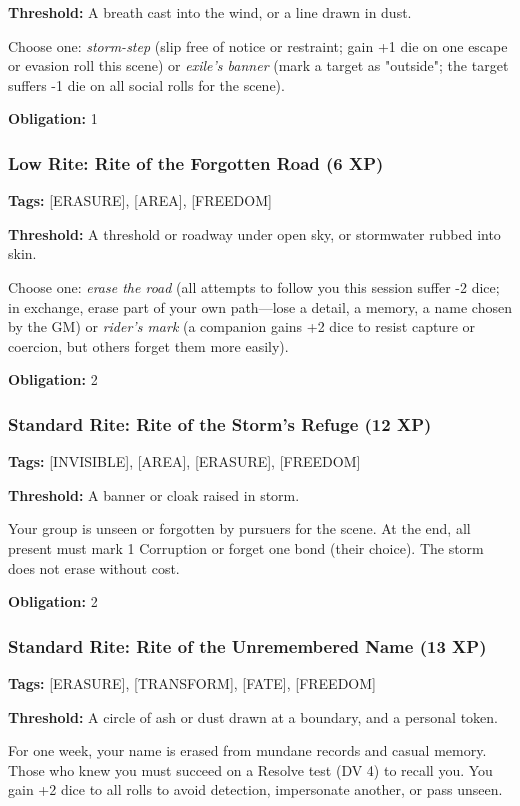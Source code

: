 \textbf{Threshold:} A breath cast into the wind, or a line drawn in dust.

Choose one: \textit{storm-step} (slip free of notice or restraint; gain +1 die on one escape or evasion roll this scene) or \textit{exile's banner} (mark a target as "outside"; the target suffers -1 die on all social rolls for the scene).

\textbf{Obligation:} 1

\subsubsection{Low Rite: Rite of the Forgotten Road (6 XP)}

\textbf{Tags:} [ERASURE], [AREA], [FREEDOM]

\textbf{Threshold:} A threshold or roadway under open sky, or stormwater rubbed into skin.

Choose one: \textit{erase the road} (all attempts to follow you this session suffer -2 dice; in exchange, erase part of your own path—lose a detail, a memory, a name chosen by the GM) or \textit{rider's mark} (a companion gains +2 dice to resist capture or coercion, but others forget them more easily).

\textbf{Obligation:} 2

\subsubsection{Standard Rite: Rite of the Storm's Refuge (12 XP)}

\textbf{Tags:} [INVISIBLE], [AREA], [ERASURE], [FREEDOM]

\textbf{Threshold:} A banner or cloak raised in storm.

Your group is unseen or forgotten by pursuers for the scene. At the end, all present must mark 1 Corruption or forget one bond (their choice). The storm does not erase without cost.

\textbf{Obligation:} 2

\subsubsection{Standard Rite: Rite of the Unremembered Name (13 XP)}

\textbf{Tags:} [ERASURE], [TRANSFORM], [FATE], [FREEDOM]

\textbf{Threshold:} A circle of ash or dust drawn at a boundary, and a personal token.

For one week, your name is erased from mundane records and casual memory. Those who knew you must succeed on a Resolve test (DV 4) to recall you. You gain +2 dice to all rolls to avoid detection, impersonate another, or pass unseen.

